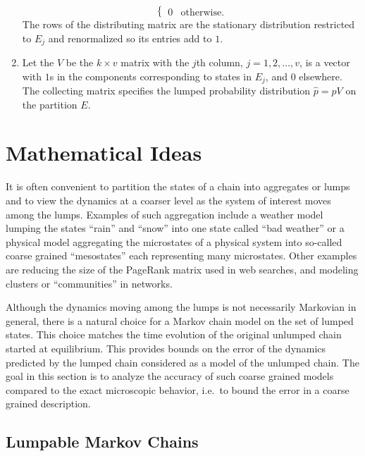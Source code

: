 \documentclass[12pt]{article}
\begin{document}
\begin{enumerate}
\[\begin{cases}
                0 & \text{otherwise}.
            \end{cases}
        \] The rows of the distributing matrix are the stationary
        distribution restricted to \( E_j \) and renormalized so its
        entries add to \( 1 \).
    \item
        Let the %
        \( V \) be the \( k \times v \) matrix with the \( j \)th
        column, \( j = 1, 2, \dots, v \), is a vector with \( 1 \)s in
        the components corresponding to states in \( E_j \), and \( 0 \)
        elsewhere.  The collecting matrix specifies the lumped
        probability distribution \( \hat{p} = p V \) on the partition \(
        E \).
\end{enumerate}

\hr

\section*{Mathematical Ideas}

It is often convenient to partition the states of a chain into
aggregates or lumps and to view the dynamics at a coarser level as the
system of interest moves among the lumps.  Examples of such aggregation
include a weather model lumping the states ``rain'' and ``snow'' into
one state called ``bad weather'' or a physical model aggregating the
microstates of a physical system into so-called coarse grained
``mesostates'' each representing many microstates.  Other examples are
reducing the size of the PageRank matrix used in web searches, and
modeling clusters or ``communities'' in networks.

Although the
dynamics moving among the lumps is not necessarily Markovian in general,
there is a natural choice for a Markov chain model on the set of lumped
states.  This choice matches the time evolution of the original unlumped
chain started at equilibrium. This provides bounds on the error of the
dynamics predicted by the lumped chain considered as a model of the
unlumped chain.  The goal in this section is to analyze the accuracy of
such coarse grained models compared to the exact microscopic behavior,
i.e.\ to bound the error in a coarse grained description.

\subsection*{Lumpable Markov Chains}
\end{document}

